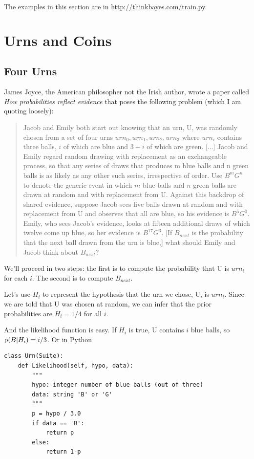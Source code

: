 \documentclass[12pt]{book}
\begin{document}
The examples in this section are in \url{http://thinkbayes.com/train.py}.


\chapter{Urns and Coins}

\section{Four Urns}

James Joyce, the American philosopher not the Irish author, wrote
a paper called {\it How probabilities reflect evidence} that poses
the following problem (which I am quoting loosely):

\begin{quote}
Jacob and Emily both start out knowing that an urn, U, was
randomly chosen from a set of four urns ${urn_0, urn_1, urn_2, urn_3}$
where $urn_i$ contains three balls, $i$ of which are blue and $3-i$ of
which are green. [...]  Jacob and Emily regard random drawing with
replacement as an exchangeable process, so that any series of draws
that produces m blue balls and n green balls is as likely as any other
such series, irrespective of order.  Use $B^m G^n$ to denote the generic
event in which $m$ blue balls and $n$ green balls are drawn at random
and with replacement from U.  Against this backdrop of shared
evidence, suppose Jacob sees five balls drawn at random and with
replacement from U and observes that all are blue, so his evidence is
$B^5 G^0$.  Emily, who sees Jacob's evidence, looks at fifteen additional
draws of which twelve come up blue, so her evidence is $B^{17} G^3$.  [If
$B_{next}$ is the probability that the next ball drawn from the urn is
blue,] what should Emily and Jacob think about $B_{next}$?
\end{quote}

We'll proceed in two steps: the first is to compute the probability
that U is $urn_i$ for each $i$.  The second is to compute $B_{next}$.

Let's use $H_i$ to represent the hypothesis that the urn we chose, U,
is $urn_i$.  Since we are told that U was chosen at random, we can
infer that the prior probabilities are $H_i = 1/4$ for all $i$.

And the likelihood function is easy.  If $H_i$ is true, U contains
$i$ blue balls, so $\mathrm{p}(B|H_i) = i/3$.  Or in Python

\begin{verbatim}
class Urn(Suite):
    def Likelihood(self, hypo, data):
        """
        hypo: integer number of blue balls (out of three)
        data: string 'B' or 'G'
        """
        p = hypo / 3.0
        if data == 'B':
            return p
        else:
            return 1-p
\end{verbatim}
\end{document}
